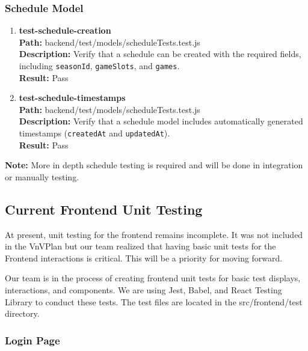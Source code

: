 \documentclass[12pt, titlepage]{article}
\begin{document}
\subsubsection{Schedule Model}
\begin{enumerate}
    \item{\textbf{test-schedule-creation}\\}
        \textbf{Path:} backend/test/models/scheduleTests.test.js\\
        \textbf{Description:} Verify that a schedule can be created with the required fields, including \texttt{seasonId}, \texttt{gameSlots}, and \texttt{games}.\\
        \textbf{Result:} Pass

    \item{\textbf{test-schedule-timestamps}\\}
        \textbf{Path:} backend/test/models/scheduleTests.test.js\\
        \textbf{Description:} Verify that a schedule model includes automatically generated timestamps (\texttt{createdAt} and \texttt{updatedAt}).\\
        \textbf{Result:} Pass
\end{enumerate}

\textbf{Note:} More in depth schedule testing is required and will be done in integration or manually testing.

\subsection{Current Frontend Unit Testing}

At present, unit testing for the frontend remains incomplete. It was not included in the VnVPlan but our team realized that having basic unit tests for the Frontend interactions is critical. This will be a priority for moving forward.

Our team is in the process of creating frontend unit tests for basic test displays, interactions, and components. We are using Jest, Babel, and React Testing Library to conduct these tests. The test files are located in the src/frontend/test directory.

\subsubsection{Login Page}
\end{document}

